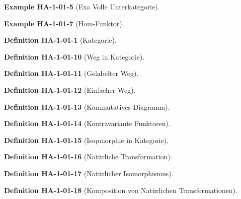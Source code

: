 \documentclass[10pt, letterpaper]{article}
\newcommand{\CustomHeading}[3]{%
  \par\medskip\noindent%
  \textbf{#1 #2} \textnormal{(#3)}.\enskip%
}
\newenvironment{DEF}[2]{\CustomHeading{Definition}{#1}{#2}}{}
\newenvironment{EXA}[2]{\CustomHeading{Example}{#1}{#2}}{}
\begin{document}
\begin{EXA}{HA-1-01-5}{Exa Volle Unterkategorie}

\end{EXA}

\begin{EXA}{HA-1-01-7}{Hom-Funktor}

\end{EXA}











\begin{DEF}{HA-1-01-1}{Kategorie}

\end{DEF}

\begin{DEF}{HA-1-01-10}{Weg in Kategorie}

\end{DEF}

\begin{DEF}{HA-1-01-11}{Gelabelter Weg}

\end{DEF}

\begin{DEF}{HA-1-01-12}{Einfacher Weg}

\end{DEF}

\begin{DEF}{HA-1-01-13}{Kommutatives Diagramm}

\end{DEF}

\begin{DEF}{HA-1-01-14}{Kontravariante Funktoren}

\end{DEF}

\begin{DEF}{HA-1-01-15}{Isopmorphie in Kategorie}

\end{DEF}

\begin{DEF}{HA-1-01-16}{Natürliche Transformation}

\end{DEF}

\begin{DEF}{HA-1-01-17}{Natürlicher Isomorphismus}

\end{DEF}

\begin{DEF}{HA-1-01-18}{Komposition von Natürlichen Transformationen}

\end{DEF}
\end{document}
